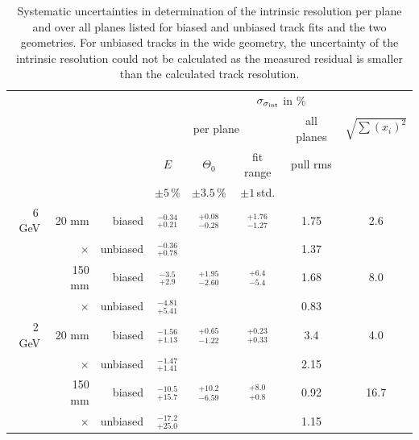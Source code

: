 \begin{table}[tbp]
 \begin{center}
  \begin{tabular}{r|r|r|c|c|c|c||c}
  \multicolumn{3}{c|}{} & \multicolumn{5}{c}{$\sigma_{\sigma_{\textrm{int}}}$ in \%}\\
  \multicolumn{3}{c|}{} & \multicolumn{3}{c|}{per plane} & all planes& $\sqrt{\sum (x_i)^2}$\\
  \multicolumn{3}{c|}{} &$E$         & $\Theta_0$      & fit range    & pull rms &  \\ 
  \multicolumn{3}{c|}{} & $\pm5\,\%$ &  $\pm 3.5\,\%$  & $\pm 1\,$std.&               &  \\ \hline
  6\,GeV & 20 mm   &  biased  &  ${}^{-0.34}_{+0.21}$ & ${}^{+0.08}_{-0.28}$ & ${}^{+1.76}_{-1.27}$ & 1.75 &  2.6  \\
         & ×       & unbiased &  ${}^{-0.36}_{+0.78}$ &  &  & 1.37 &    \\
	 & 150 mm  &  biased  &  ${}^{-3.5}_{+2.9}$   & ${}^{+1.95}_{-2.60}$ & ${}^{+6.4}_{-5.4}$ & 1.68 &  8.0  \\
	 & ×       & unbiased &  ${}^{-4.81}_{+5.41}$ &  &  & 0.83 &    \\ \hline
  2\,GeV & 20 mm   &  biased  &  ${}^{-1.56}_{+1.13}$ & ${}^{+0.65}_{-1.22}$ & ${}^{+0.23}_{+0.33}$ & 3.4 &  4.0  \\
         & ×       & unbiased &  ${}^{-1.47}_{+1.41}$ &  &  & 2.15 &    \\
	 & 150 mm  &  biased  &  ${}^{-10.5}_{+15.7}$ & ${}^{+10.2}_{-6.59}$ & ${}^{+8.0}_{+0.8}$ & 0.92 &  16.7 \\
	 & ×       & unbiased &  ${}^{-17.2}_{+25.0}$ &  &  & 1.15 &    \\ 
  \end{tabular}
    \caption[Systematic uncertainties]{Systematic uncertainties in determination of the intrinsic resolution per plane and over all planes listed for biased and unbiased track fits and the two geometries.
  For unbiased tracks in the wide geometry, the uncertainty of the intrinsic resolution could not be calculated as the measured residual is smaller than the calculated track resolution.}
  \label{tab:uncerts}
 \end{center}
\end{table}

